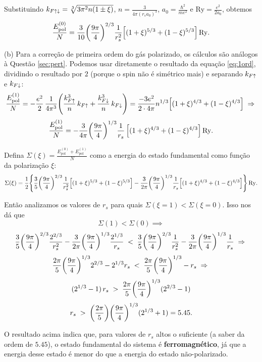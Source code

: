 \documentclass[a4paper,10pt]{article}
\begin{document}
Substituindo $k_{F\uparrow\downarrow} = \sqrt[3]{3 \pi^2 n (1 \pm \xi)}$, $n = \frac{3}{4\pi (r_s a_0)^3}$, $a_0 = \frac{\hbar^2}{m e^2}$ e $\text{Ry} = \frac{e^2}{2a_0}$, obtemos
$$
\frac{E_{\text{pol}}^{(0)}}{N} = \frac{3}{10} \qty(\frac{9\pi}{4})^{2/3} \frac{1}{r_s^2}
\qty[(1+\xi)^{5/3} + (1-\xi)^{5/3}] \, \text{Ry}.
$$

(b) Para a correção de primeira ordem do gás polarizado, os cálculos são análogos à Questão \ref{sec:pert}. Podemos usar diretamente o resultado da equação \ref{eq:1ord}, dividindo o resultado por $2$ (porque o spin não é simétrico mais) e separando $k_{F\uparrow}$ e $k_{F\downarrow}$:
$$
\frac{E_{\text{pol}}^{(1)}}{N} =
- \frac{e^2}{2} \, \frac{1}{4\pi^3} \qty(\frac{k_{F\uparrow}^3}{n} \, k_{F\uparrow} + \frac{k_{F\downarrow}^3}{n} \, k_{F\downarrow}) =
\frac{-3e^2}{2 \cdot 4\pi} n^{1/3} \qty[(1+\xi)^{4/3} + (1-\xi)^{4/3}] \; \Rightarrow \;
$$
$$
\frac{E_{\text{pol}}^{(1)}}{N} =
- \frac{3}{4\pi} \qty(\frac{9\pi}{4})^{1/3} \frac{1}{r_s} \, \qty[(1+\xi)^{4/3} + (1-\xi)^{4/3}] \, \text{Ry}.
$$

Defina $\Sigma(\xi) = \frac{E_{\text{pol}}^{(0)} + E_{\text{pol}}^{(1)}}{N}$ como a energia do estado fundamental como função da polarização $\xi$:
$$
\Sigma(\xi) =
\frac{1}{2} \qty{ \frac{3}{5} \qty(\frac{9\pi}{4})^{2/3} \frac{1}{r_s^2}
\qty[(1+\xi)^{5/3} + (1-\xi)^{5/3}]
- \frac{3}{2\pi} \qty(\frac{9\pi}{4})^{1/3} \frac{1}{r_s} \qty[(1+\xi)^{4/3} + (1-\xi)^{4/3}]
} \, \text{Ry}.
$$

Então analizamos os valores de $r_s$ para quais $\Sigma(\xi = 1) < \Sigma(\xi = 0)$. Isso nos dá que
$$
\Sigma(1) < \Sigma(0) \implies
$$
$$
\frac{3}{5} \qty(\frac{9\pi}{4})^{2/3} \frac{2^{2/3}}{r_s^2}
- \frac{3}{2\pi} \qty(\frac{9\pi}{4})^{1/3} \frac{2^{1/3}}{r_s} \; < \;
\frac{3}{5} \qty(\frac{9\pi}{4})^{2/3} \frac{1}{r_s^2}
- \frac{3}{2\pi} \qty(\frac{9\pi}{4})^{1/3} \frac{1}{r_s} \; \Rightarrow \;
$$
$$
\frac{2\pi}{5} \qty(\frac{9\pi}{4})^{1/3} 2^{2/3} - 2^{1/3} r_s \; < \;
\frac{2\pi}{5} \qty(\frac{9\pi}{4})^{1/3} - r_s \; \Rightarrow \;
$$
$$
(2^{1/3} - 1) \, r_s \; > \; \frac{2\pi}{5} \qty(\frac{9\pi}{4})^{1/3} (2^{2/3} - 1)
$$
$$
r_s \; > \; \qty(\frac{2\pi}{5}) \qty(\frac{9\pi}{4})^{1/3} (2^{1/3} + 1) = 5.45.
$$

O resultado acima indica que, para valores de $r_s$ altos o suficiente (a saber da ordem de $5.45$), o estado fundamental do sistema é \textbf{ferromagnético}, já que a energia desse estado é menor do que a energia do estado não-polarizado.



\pagebreak
\end{document}
